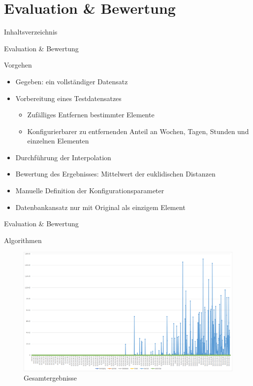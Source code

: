 \section{Evaluation \& Bewertung}
\begin{frame}{Inhaltsverzeichnis}
\tableofcontents[currentsection]
\end{frame}

\begin{frame}{Evaluation \& Bewertung}
\begin{block}{Vorgehen}
\begin{itemize}
	\item Gegeben: ein vollständiger Datensatz
	\item Vorbereitung eines Testdatensatzes
	\begin{itemize}
		\item Zufälliges Entfernen bestimmter Elemente
		\item Konfigurierbarer zu entfernenden Anteil an Wochen, Tagen, Stunden und einzelnen Elementen
	\end{itemize}
	\item Durchführung der Interpolation
	\item Bewertung des Ergebnisses: Mittelwert der euklidischen Distanzen
	\item Manuelle Definition der Konfigurationsparameter
	\item Datenbankansatz nur mit Original als einzigem Element
\end{itemize}
\end{block}
\end{frame}

\begin{frame}{Evaluation \& Bewertung}
\begin{block}{Algorithmen}
\begin{figure}
	\centering
	\includegraphics[width=1\textwidth]{pics/evaluation-algorithms-1.png}
	\caption{Gesamtergebnisse}
\end{figure}
\end{block}
\end{frame}

